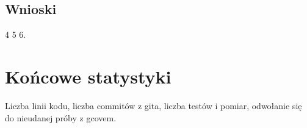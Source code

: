\documentclass{article}
\begin{document}
	\subsection{Wnioski}
 	4 5 6.
 	
 	\section{Końcowe statystyki}
 	Liczba linii kodu, liczba commitów z gita, liczba testów i pomiar, odwołanie się do nieudanej próby z gcovem.
 	
 
  
\end{document}
